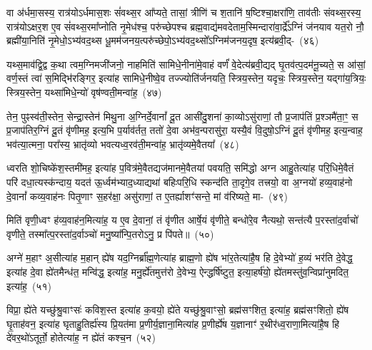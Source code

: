 वा अ॑र्धमा॒सस्य॒ रात्र॑यो\-ऽर्धमास॒शः सं॑वथ्स॒र आ᳚प्यते॒ तासां॒ त्रीणि॑ च श॒तानि॑ ष॒ष्टिश्चा॒क्षरा॑णि॒ ताव॑तीः संवथ्स॒रस्य॒ रात्र॑यो\-ऽक्षर॒श ए॒व सं॑वथ्स॒रमा᳚प्नोति नृ॒मेध॑श्च॒ परु॑च्छेपश्च ब्रह्म॒वाद्य॑मवदेताम॒स्मिन्दारा॑वा॒र्द्रे᳚\-ऽग्निं ज॑नयाव यत॒रो नौ॒ ब्रह्मी॑या॒निति॑ नृ॒मेधो॒\-ऽभ्य॑वद॒थ्स धू॒मम॑जनय॒त्परु॑च्छेपो॒\-ऽभ्य॑वद॒थ्सो᳚\-ऽग्निम॑जनय॒दृष॒ इत्य॑ब्रवी॒द्-~(४६)

यथ्स॒माव॑द्वि॒द्व क॒था त्वम॒ग्निमजी॑जनो॒ नाहमिति॑ सामिधे॒नीना॑मे॒वाहं वर्णं॑ वे॒देत्य॑ब्रवी॒द्यद् घृ॒तव॑त्प॒दम॑नू॒च्यते॒ स आ॑सां॒ वर्ण॒स्तं त्वा॑ स॒मिद्भि॑रङ्गिर॒ इत्या॑ह सामिधे॒नीष्वे॒व तज्ज्योति॑र्जनयति॒ स्त्रिय॒स्तेन॒ यदृचः॒ स्त्रिय॒स्तेन॒ यद्गा॑य॒त्रियः॒ स्त्रिय॒स्तेन॒ यथ्सा॑मिधे॒न्यो॑ वृष॑ण्वती॒मन्वा॑ह॒~(४७)

तेन॒ पुꣴस्व॑ती॒स्तेन॒ सेन्द्रा॒स्तेन॑ मिथु॒ना अ॒ग्निर्दे॒वानां᳚ दू॒त आसी॑दु॒शना॑ का॒व्यो\-ऽसु॑राणां॒ तौ प्र॒जा\-प॑तिं प्र॒श्ञमै॑ता॒ꣳ॒ स प्र॒जा\-प॑तिर॒ग्निं दू॒तं वृ॑णीमह॒ इत्य॒भि प॒र्याव॑र्तत॒ ततो॑ दे॒वा अभ॑व॒न्परासु॑रा॒ यस्यै॒वं वि॒दुषो॒\-ऽग्निं दू॒तं वृ॑णीमह॒ इत्य॒न्वाह॒ भव॑त्या॒त्मना॒ परा᳚स्य॒ भ्रातृ॑व्यो भवत्यध्व॒रव॑ती॒मन्वा॑ह॒ भ्रातृ॑व्यमे॒वैतया᳚~(४८)

ध्वरति शो॒चिष्के॑श॒स्तमी॑मह॒ इत्या॑ह प॒वित्र॑मे॒वैतद्यज॑\-मान\-मे॒वै\-तया॑ पवयति॒ समि॑द्धो अग्न आहु॒तेत्या॑ह परि॒धिमे॒वैतं परि॑ दधा॒\-त्य\-स्क॑न्दाय॒ यदत॑ ऊ॒र्ध्वम॑भ्याद॒ध्याद्यथा॑ बहिःपरि॒धि स्कन्द॑ति ता॒दृगे॒व तत्त्रयो॒ वा अ॒ग्नयो॑ हव्य॒वाह॑नो दे॒वानां᳚ कव्य॒वाह॑नः पितृ॒णाꣳ स॒हर॑क्षा॒ असु॑राणां॒ त ए॒तर्\mbox{}ह्याशꣳ॑सन्ते॒ मां व॑रिष्यते॒ मा-~(४९)

मिति॑ वृणी॒ध्वꣳ ह॑व्य॒वाह॑न॒मित्या॑ह॒ य ए॒व दे॒वानां॒ तं वृ॑णीत आर्\mbox{}षे॒यं वृ॑णीते॒ बन्धो॑रे॒व नैत्यथो॒ सन्त॑त्यै प॒रस्ता॑द॒र्वाचो॑ वृणीते॒ तस्मा᳚त्प॒रस्ता॑द॒र्वाञ्चो॑ मनु॒ष्या᳚न्पि॒तरो\-ऽनु॒ प्र पि॑पते॥~(५०)

{\anuvakamend[{अशा᳚न्तावाह॒ पञ्च॑दशाब्रवी॒दन्वा॑है॒तया॑ वरिष्यते॒ मामेका॒न्नत्रि॒ꣳ॒शच्च॑}]}%

अग्ने॑ म॒हाꣳ अ॒सीत्या॑ह म॒हान् ह्ये॑ष यद॒ग्निर्ब्रा᳚ह्म॒णेत्या॑ह ब्राह्म॒णो ह्ये॑ष भा॑र॒तेत्या॑है॒ष हि दे॒वेभ्यो॑ ह॒व्यं भर॑ति दे॒वेद्ध॒ इत्या॑ह दे॒वा ह्ये॑तमैन्ध॑त॒ मन्वि॑द्ध॒ इत्या॑ह॒ मनु॒र्ह्ये॑तमुत्त॑रो दे॒वेभ्य॒ ऐन्द्धर्\mbox{}षि॑ष्टुत॒ इत्या॒हर्\mbox{}ष॑यो॒ ह्ये॑तमस्तु॑व॒न्विप्रा॑नुमदित॒ इत्या॑ह॒~(५१)

विप्रा॒ ह्ये॑ते यच्छु॑श्रु॒वाꣳसः॑ कविश॒स्त इत्या॑ह क॒वयो॒ ह्ये॑ते यच्छु॑श्रु॒वाꣳसो॒ ब्रह्म॑सꣳशित॒ इत्या॑ह॒ ब्रह्म॑सꣳशितो॒ ह्ये॑ष घृ॒ताह॑वन॒ इत्या॑ह घृताहु॒तिर्\mbox{}ह्य॑स्य प्रि॒यत॑मा प्र॒णीर्य॒ज्ञाना॒मित्या॑ह प्र॒णीर्\mbox{}ह्ये॑ष य॒ज्ञानाꣳ॑ र॒थीर॑ध्व॒राणा॒मित्या॑है॒ष हि दे॑वर॒थो॑\-ऽतूर्तो॒ होतेत्या॑ह॒ न ह्ये॑तं कश्च॒न~(५२)


